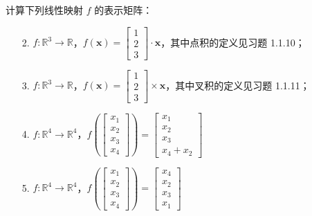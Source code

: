 	\newpage
	\begin{exercise}[1.2.5]
		计算下列线性映射 $f$ 的表示矩阵：
		\begin{enumerate}
			\item[2.] $f:\mathbb{R}^3\rightarrow\mathbb{R}$，$f(\boldsymbol{x})=\begin{bmatrix}
				1\\2\\3
			\end{bmatrix}\cdot\boldsymbol{x}$，其中点积的定义见习题 1.1.10；
			\item[3.] $f:\mathbb{R}^3\rightarrow\mathbb{R}$，$f(\boldsymbol{x})=\begin{bmatrix}
				1\\2\\3
			\end{bmatrix}\times\boldsymbol{x}$，其中叉积的定义见习题 1.1.11；
			\item[4.] $f:\mathbb{R}^4\rightarrow\mathbb{R}^4$，$f\left(\begin{bmatrix}
				x_1\\x_2\\x_3\\x_4
			\end{bmatrix}\right)=\begin{bmatrix}
				x_1\\x_2\\x_3\\x_4+x_2
			\end{bmatrix}$
			\item[5.] $f:\mathbb{R}^4\rightarrow\mathbb{R}^4$，$f\left(\begin{bmatrix}
				x_1\\x_2\\x_3\\x_4
			\end{bmatrix}\right)=\begin{bmatrix}
				x_4\\x_2\\x_3\\x_1
			\end{bmatrix}$
	
		\end{enumerate}
	\end{exercise}

